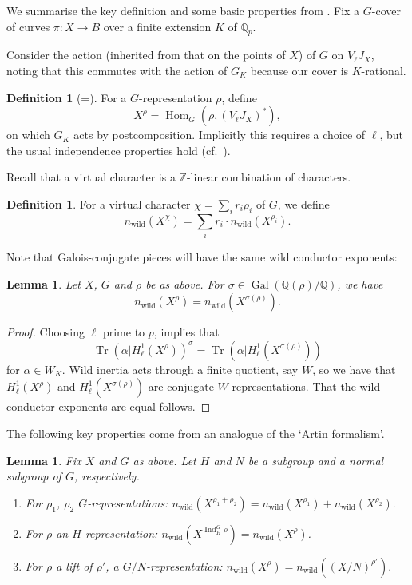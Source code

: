 \documentclass[12pt]{amsart}
\newtheorem{lemma}[theorem]{Lemma}
\theoremstyle{definition}
\newtheorem{definition}[theorem]{Definition}
\theoremstyle{remark}
\newcommand{\QQ}{\mathbb{Q}}
\newcommand{\ZZ}{\mathbb{Z}}
\DeclareMathOperator{\Tr}{Tr}
\DeclareMathOperator{\Gal}{Gal}
\DeclareMathOperator{\Hom}{Hom}
\DeclareMathOperator{\Ind}{Ind}
\DeclareMathOperator{\wild}{wild}
\begin{document}
We summarise the key definition and some basic properties from \cite[\S 2]{DGKM}. Fix a $G$-cover of curves $\pi: X\to B$ over a finite extension $K$ of $\QQ_p$.

Consider the action (inherited from that on the points of $X$) of $G$ on $V_\ell J_X$, noting that this commutes with the action of $G_K$ because our cover is $K$-rational.

\begin{definition}[{=\cite[Definition 2.3]{DGKM}}]
    For a $G$-representation $\rho$, define
    \[ X^\rho=\Hom_G(\rho,(V_\ell J_X)^*),\]
    on which $G_K$ acts by postcomposition. Implicitly this requires a choice of $\ell$, but the usual independence properties hold (cf.\ \cite[Corollary 2.14]{DGKM}).
\end{definition}

Recall that a virtual character is a $\ZZ$-linear combination of characters.

\begin{definition}
    For a virtual character $\chi = \sum_i r_i\rho_i$ of $G$, we define
    \[n_{\wild}(X^\chi)=\sum_i r_i\cdot n_{\wild}(X^{\rho_i}).\]
\end{definition}

Note that Galois-conjugate pieces will have the same wild conductor exponents:

\begin{lemma}\label{lem:conj_cond}
    Let $X$, $G$ and $\rho$ be as above. For $\sigma \in \Gal(\QQ(\rho)/\QQ)$, we have
    \[ n_{\wild}(X^\rho) = n_{\wild}(X^{\sigma(\rho)}). \]
\end{lemma}

\begin{proof}
    Choosing $\ell$ prime to $p$, \cite[Lemma 2.12]{DGKM} implies that 
    \[\Tr(\alpha | H^1_\ell(X^\rho))^\sigma = \Tr(\alpha | H^1_\ell(X^{\sigma(\rho)})) \]
    for $\alpha\in W_K$. Wild inertia acts through a finite quotient, say $W$, so we have that $H^1_\ell(X^\rho)$ and $H^1_\ell(X^{\sigma(\rho)})$ are conjugate $W$-representations. That the wild conductor exponents are equal follows.
\end{proof}

The following key properties come from an analogue of the `Artin formalism'.

\begin{lemma}\label{lem:induction}
    Fix ${X}$ and $G$ as above. Let $H$ and $N$ be a subgroup and a normal subgroup of $G$, respectively.
    \begin{enumerate}
        \item For $\rho_1$, $\rho_2$ $G$-representations: $n_{\wild}({X}^{\rho_1+\rho_2})=n_{\wild}({X}^{\rho_1})+n_{\wild}({X}^{\rho_2}).$
        \item For $\rho$ an $H$-representation: $n_{\wild}({X}^{\Ind_H^G \rho})=n_{\wild}({X}^\rho)$.
        \item For $\rho$ a lift of $\rho'$, a $G/N$-representation: $n_{\wild}(X^\rho)=n_{\wild}((X/N)^{\rho'}).$
    \end{enumerate}
\end{lemma}
\end{document}

